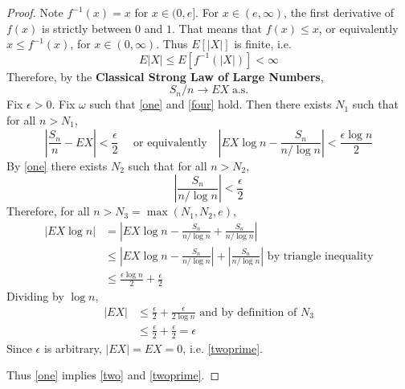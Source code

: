 \documentclass[letterpaper, 12pt]{article}
\newcommand{\as}{\;\text{a.s.}}
\begin{document}
\begin{proof}
Note $f^{-1}(x) = x$ for $x \in (0,e]$. For $x \in (e,\infty)$, the first derivative of $f(x)$ is strictly between $0$ and $1$. 
That means that $f(x) \leq x$, or equivalently $x \leq f^{-1}(x)$, for $x \in (0, \infty)$. Thus $E[|X|]$ is finite, i.e.
\begin{equation}
E|X| \leq E[f^{-1}(|X|)] < \infty
\label{finite}
\end{equation}
Therefore, by the \textbf{Classical Strong Law of Large Numbers},
\begin{equation}
S_n / n \to EX \as
\label{four}
\end{equation} 
Fix $\epsilon > 0$. Fix $\omega$ such that \eqref{one} and \eqref{four} hold. Then there exists $N_1$ such that for all $n > N_1$, 
\[
\left\lvert 
\frac{S_n}{n} - EX
\right\rvert
< \frac{\epsilon}{2}
\quad
\text{ or equivalently}\quad
\left\lvert 
EX \log n - \frac{S_n}{n/\log n}
\right\rvert
< \frac{\epsilon \log n}{2}
\]
By \eqref{one} there exists $N_2$ such that for all $n > N_2$, 
\[
\left\lvert 
\frac{S_n}{n/\log n}
\right\rvert
< \frac{\epsilon}{2}
\]
Therefore, for all $n > N_3=\max(N_1, N_2, e)$,
\begin{align*}
\left\lvert 
EX \log n
\right\rvert
&=
\left\lvert 
EX \log n - \frac{S_n}{n/\log n} + \frac{S_n}{n/\log n}
\right\rvert
\\
&\leq
\left\lvert 
EX \log n - \frac{S_n}{n/\log n} 
\right\rvert
+ 
\left\lvert 
\frac{S_n}{n/\log n}
\right\rvert
\text{ by triangle inequality}
\\
&\leq
\frac{\epsilon \log n}{2}
+
\frac{\epsilon}{2}
\end{align*}
Dividing by $\log n$,
\begin{align*}
|EX|
&\leq
\frac{\epsilon}{2}
+
\frac{\epsilon}{2 \log n}
\text{ and by definition of $N_3$}
\\
&\leq
\frac{\epsilon}{2}
+
\frac{\epsilon}{2}
= \epsilon
\end{align*}
Since $\epsilon$ is arbitrary, $|EX| = EX = 0$, i.e. \eqref{twoprime}.

Thus \eqref{one} implies \eqref{two} and \eqref{twoprime}.
\end{proof}
\end{document}
